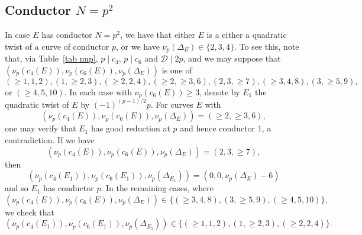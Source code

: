 \subsection{Conductor $N=p^2$}

In case $E$ has conductor $N=p^2$, we have that either $E$ is a either a quadratic twist of a curve of conductor $p$, or we have $\nu_p (\Delta_E) \in \{ 2, 3, 4 \}$.
To see this, note that, via  Table~\ref{tab nup}, $p \mid c_4$, $p \mid c_6$ and 
$\mathcal{D} \mid 2p$, and we may suppose that 
$(\nu_p (c_4(E)),  \nu_p (c_6(E)), \nu_p (\Delta_E) )$ is one of
$$
(\geq 1, 1, 2),   (1, \geq 2, 3),   (\geq 2, 2,4),
(\geq 2, \geq 3, 6),  (2,3,\geq 7),  (\geq 3, 4, 8), 
(3, \geq 5, 9 ), $$
or $(\geq 4, 5, 10).$ In each case with $\nu_p (c_6(E)) \geq 3$, denote by $E_1$ the quadratic twist of $E$ by $(-1)^{(p-1)/2} p$. For curves $E$ with 
$$
(\nu_p (c_4(E)),  \nu_p (c_6(E)), \nu_p (\Delta_E) )=(\geq 2, \geq 3, 6), 
$$
one may verify that $E_1$ has good 
reduction at $p$ and hence conductor $1$, a contradiction. If we have
$$
(\nu_p (c_4(E)),  \nu_p (c_6(E)), \nu_p (\Delta_E) )=(2, 3, \geq 7),
$$
then
$$
(\nu_p (c_4(E_1)),  \nu_p (c_6(E_1)), \nu_p (\Delta_{E_1}) ) = (0, 0, \nu_p (\Delta_E)-6)
$$
and so $E_1$ has conductor $p$. In the remaining cases, where
$$
(\nu_p (c_4(E)),  \nu_p (c_6(E)), \nu_p (\Delta_E) ) \in \{ (\geq 3, 4, 8), (3, \geq 5, 9 ), (\geq 4, 5, 10) \},
$$
we check that
$$
(\nu_p (c_4(E_1)),  \nu_p (c_6(E_1)), \nu_p (\Delta_{E_1}) ) \in \{ (\geq 1, 1, 2),   (1, \geq 2, 3),   (\geq 2, 2,4) \}.
$$

